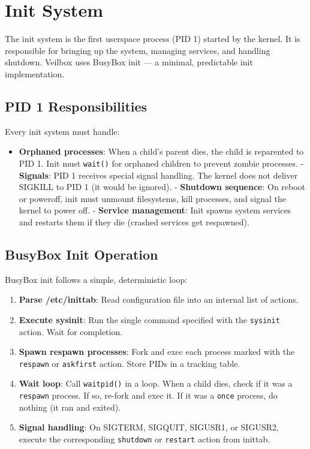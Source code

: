 \chapter{Init System}
\label{ch:initsys}

The init system is the first userspace process (PID 1) started by the
kernel. It is responsible for bringing up the system, managing services,
and handling shutdown. Veilbox uses BusyBox init — a minimal, predictable
init implementation.

\section{PID 1 Responsibilities}

Every init system must handle:

\begin{itemize}[nosep]
  \item \textbf{Orphaned processes}: When a child's parent dies, the child
        is reparented to PID 1. Init must \texttt{wait()} for orphaned
        children to prevent zombie processes.
  - \textbf{Signals}: PID 1 receives special signal handling. The kernel
        does not deliver SIGKILL to PID 1 (it would be ignored).
  - \textbf{Shutdown sequence}: On reboot or poweroff, init must unmount
        filesystems, kill processes, and signal the kernel to power off.
  - \textbf{Service management}: Init spawns system services and restarts
        them if they die (crashed services get respawned).
\end{itemize}

\section{BusyBox Init Operation}

BusyBox init follows a simple, deterministic loop:

\begin{enumerate}[nosep]
  \item \textbf{Parse /etc/inittab}: Read configuration file into an
        internal list of actions.
  \item \textbf{Execute sysinit}: Run the single command specified with
        the \texttt{sysinit} action. Wait for completion.
  \item \textbf{Spawn respawn processes}: Fork and exec each process
        marked with the \texttt{respawn} or \texttt{askfirst} action.
        Store PIDs in a tracking table.
  \item \textbf{Wait loop}: Call \texttt{waitpid()} in a loop. When a
        child dies, check if it was a \texttt{respawn} process. If so,
        re-fork and exec it. If it was a \texttt{once} process, do
        nothing (it ran and exited).
  \item \textbf{Signal handling}: On SIGTERM, SIGQUIT, SIGUSR1, or
        SIGUSR2, execute the corresponding \texttt{shutdown} or
        \texttt{restart} action from inittab.
\end{enumerate}

